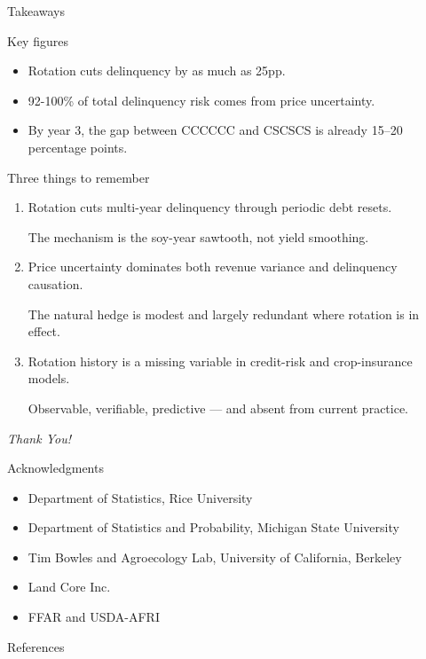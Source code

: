 \documentclass[notes, 10pt, aspectratio=169]{beamer}
\begin{document}
\begin{frame}{Takeaways}
\begin{block}{Key figures}
    \begin{itemize}
        \item Rotation cuts delinquency by as much as 25pp.
        \item 92-100\% of total delinquency risk comes from price uncertainty.
        \item By year 3, the gap between CCCCCC and CSCSCS is already 15–20 percentage points.
    \end{itemize}
\end{block}
\begin{block}{Three things to remember}
    \begin{enumerate}
        \item \textcolor{razorbackred}{Rotation cuts multi-year delinquency through periodic debt resets}.
        
        The mechanism is the soy-year sawtooth, not yield smoothing.
        \item \textcolor{springwater}{Price uncertainty dominates both revenue variance and delinquency causation}.

        The natural hedge is modest and largely redundant where rotation is in effect.
        \item \textcolor{pine}{Rotation history is a missing variable in credit-risk and crop-insurance models}.

        Observable, verifiable, predictive — and absent from current practice.
    \end{enumerate}
\end{block}
\end{frame}

\begin{frame}{}
	\centering \Huge
	\emph{Thank You!}

\begin{block}{Acknowledgments}
  \small
    \begin{itemize}
        \item Department of Statistics, Rice University
        \item Department of Statistics and Probability, Michigan State University
        \item Tim Bowles and Agroecology Lab, University of California, Berkeley
        \item Land Core Inc.
        \item FFAR and USDA-AFRI
    \end{itemize}  
\end{block}
\end{frame}

\begin{frame}[allowframebreaks]{References}
		
\end{frame}	
\end{document}
